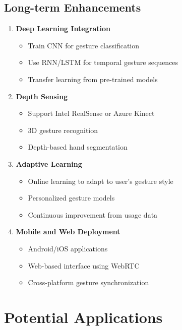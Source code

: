 \documentclass[12pt,a4paper]{report}
\begin{document}
\subsection{Long-term Enhancements}

\begin{enumerate}
    \item \textbf{Deep Learning Integration}
    \begin{itemize}
        \item Train CNN for gesture classification
        \item Use RNN/LSTM for temporal gesture sequences
        \item Transfer learning from pre-trained models
    \end{itemize}
    
    \item \textbf{Depth Sensing}
    \begin{itemize}
        \item Support Intel RealSense or Azure Kinect
        \item 3D gesture recognition
        \item Depth-based hand segmentation
    \end{itemize}
    
    \item \textbf{Adaptive Learning}
    \begin{itemize}
        \item Online learning to adapt to user's gesture style
        \item Personalized gesture models
        \item Continuous improvement from usage data
    \end{itemize}
    
    \item \textbf{Mobile and Web Deployment}
    \begin{itemize}
        \item Android/iOS applications
        \item Web-based interface using WebRTC
        \item Cross-platform gesture synchronization
    \end{itemize}
\end{enumerate}

\section{Potential Applications}
\end{document}
